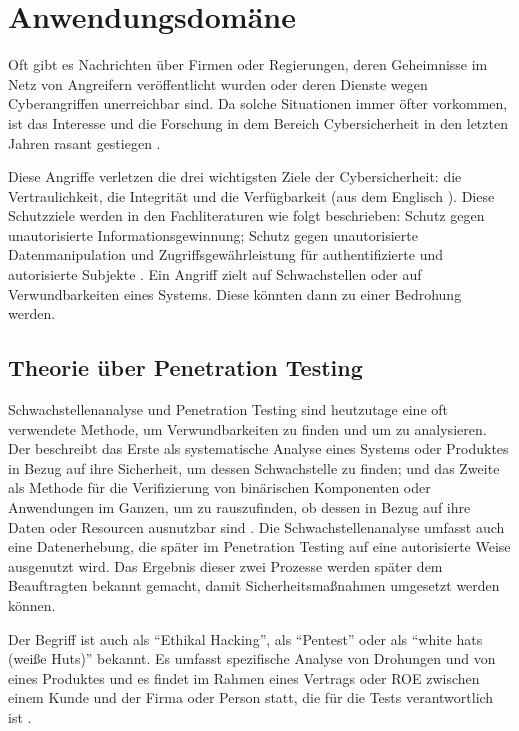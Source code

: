 \section{Anwendungsdomäne}

Oft gibt es Nachrichten über Firmen oder Regierungen, deren Geheimnisse im Netz von Angreifern veröffentlicht wurden oder deren Dienste wegen \gls{Cyberangriff}en unerreichbar sind. Da solche Situationen immer öfter vorkommen, ist das Interesse und die Forschung in dem Bereich \gls{Cybersicherheit} in den letzten Jahren rasant gestiegen \citep{Tanembaum_MBS}. 

Diese Angriffe verletzen die drei wichtigsten Ziele der \gls{Cybersicherheit}: die Vertraulichkeit, die Integrität und die Verfügbarkeit (aus dem Englisch ). Diese Schutzziele werden in den Fachliteraturen wie folgt beschrieben: Schutz gegen unautorisierte Informationsgewinnung; Schutz gegen unautorisierte Datenmanipulation und Zugriffsgewährleistung für authentifizierte und autorisierte Subjekte \citep{Wendzel_It-Sicherheit}. Ein Angriff zielt auf \gls{Schwachstelle}n oder auf \gls{Verwundbarkeit}en eines Systems. Diese könnten dann zu einer Bedrohung werden.

\subsection{Theorie über Penetration Testing}

Schwachstellenanalyse und Penetration Testing sind heutzutage eine oft verwendete Methode, um \gls{Verwundbarkeit}en zu finden und um zu analysieren. Der  beschreibt das Erste als systematische Analyse eines Systems oder Produktes in Bezug auf ihre Sicherheit, um dessen \gls{Schwachstelle} zu finden; und das Zweite als Methode für die Verifizierung von binärischen Komponenten oder Anwendungen im Ganzen, um zu rauszufinden, ob dessen  in Bezug auf ihre Daten oder Resourcen ausnutzbar sind \citep{NIST_Definitionen}. Die Schwachstellenanalyse umfasst auch eine Datenerhebung, die später im Penetration Testing auf eine autorisierte Weise ausgenutzt wird\citep{Goel_VulAsses_PenTest}. Das Ergebnis dieser zwei Prozesse werden später dem Beauftragten bekannt gemacht, damit Sicherheitsmaßnahmen umgesetzt werden können.

Der Begriff ist auch als ``Ethikal Hacking'', als ``Pentest'' oder als ``white hats (weiße Huts)'' bekannt. Es umfasst spezifische Analyse von Drohungen und von  eines Produktes und es findet im Rahmen eines Vertrags oder \gls{ROE} zwischen einem Kunde und der Firma oder Person statt, die für die Tests verantwortlich ist \citep{Bishop_PenTest}.

